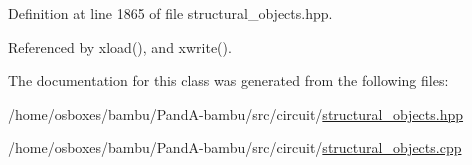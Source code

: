 Definition at line 1865 of file structural\+\_\+objects.\+hpp.



Referenced by xload(), and xwrite().



The documentation for this class was generated from the following files\+:\begin{DoxyCompactItemize}
\item 
/home/osboxes/bambu/\+Pand\+A-\/bambu/src/circuit/\hyperlink{structural__objects_8hpp}{structural\+\_\+objects.\+hpp}\item 
/home/osboxes/bambu/\+Pand\+A-\/bambu/src/circuit/\hyperlink{structural__objects_8cpp}{structural\+\_\+objects.\+cpp}\end{DoxyCompactItemize}
